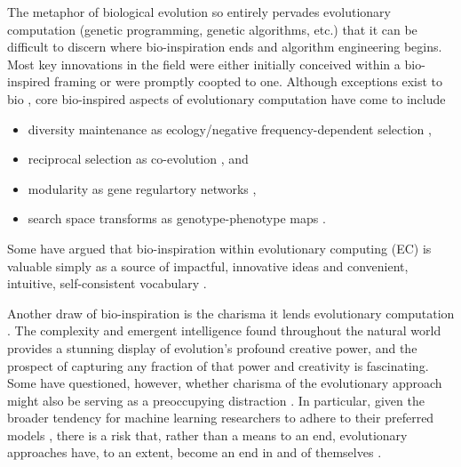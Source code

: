 The metaphor of biological evolution so entirely pervades evolutionary computation (genetic programming, genetic algorithms, etc.) that it can be difficult to discern where bio-inspiration ends and algorithm engineering begins.
Most key innovations in the field were either initially conceived within a bio-inspired framing or were promptly coopted to one.
Although exceptions exist to bio \citep{hansen2001completely,munteanu1999improving}, core bio-inspired aspects of evolutionary computation have come to include
\begin{itemize}
  \item diversity maintenance as ecology/negative frequency-dependent selection \citep{dolson2018ecological,dolson2018applying},
  \item reciprocal selection as co-evolution \citep{lehman2010efficiently,harper2012spatial,garbus2024accelerating,koza1991genetic,kala2012multi}, and
  \item modularity as gene regulartory networks \citep{TODO},
  \item search space transforms as genotype-phenotype maps \citep{lehman2023evolution,moreno2018learning,lehman2023evolution,bentley2022evolving,gaier2020discovering}.
\end{itemize}
Some have argued that bio-inspiration within evolutionary computing (EC) is valuable simply as a source of impactful, innovative ideas and convenient, intuitive, self-consistent vocabulary \citep{sorensen2015metaheuristics,banzhaf2006artificial}.

Another draw of bio-inspiration is the charisma it lends evolutionary computation \citep{lehman2020surprising}.
The complexity and emergent intelligence found throughout the natural world provides a stunning display of evolution’s profound creative power, and the prospect of capturing any fraction of that power and creativity is fascinating.
Some have questioned, however, whether charisma of the evolutionary approach might also be serving as a preoccupying distraction \citep{moore2023evolution,sorensen2015metaheuristics}.
In particular, given the broader tendency for machine learning researchers to adhere to their preferred models \citep{domingos2012few}, there is a risk that, rather than a means to an end, evolutionary approaches have, to an extent, become an end in and of themselves \citep{woodward2016gp,yampolskiy2018we}.


